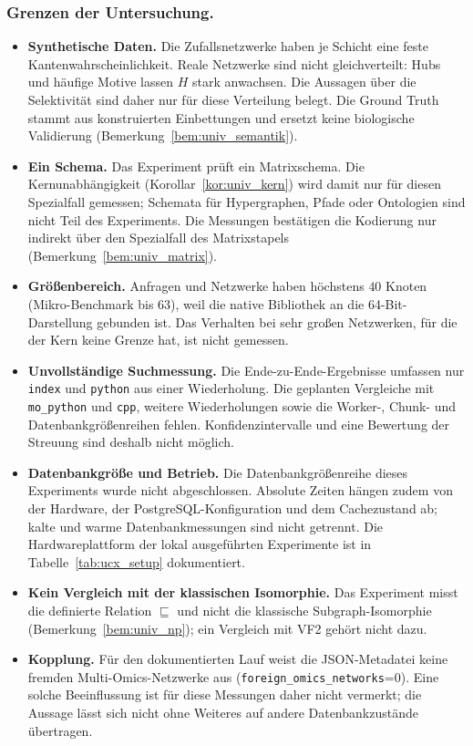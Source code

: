 \documentclass[a4paper,12pt, twoside]{report}
\theoremstyle{definition}
\begin{document}
\subsubsection{Grenzen der Untersuchung.}
\begin{itemize}
	\item \textbf{Synthetische Daten.} Die Zufallsnetzwerke haben je Schicht eine feste Kantenwahrscheinlichkeit. Reale Netzwerke sind nicht gleichverteilt: Hubs und häufige Motive lassen $H$ stark anwachsen. Die Aussagen über die Selektivität sind daher nur für diese Verteilung belegt. Die Ground Truth stammt aus konstruierten Einbettungen und ersetzt keine biologische Validierung (Bemerkung~\ref{bem:univ_semantik}).
	\item \textbf{Ein Schema.} Das Experiment prüft ein Matrixschema. Die Kernunabhängigkeit (Korollar~\ref{kor:univ_kern}) wird damit nur für diesen Spezialfall gemessen; Schemata für Hypergraphen, Pfade oder Ontologien sind nicht Teil des Experiments. Die Messungen bestätigen die Kodierung nur indirekt über den Spezialfall des Matrixstapels (Bemerkung~\ref{bem:univ_matrix}).
	\item \textbf{Größenbereich.} Anfragen und Netzwerke haben höchstens $40$ Knoten (Mikro-Benchmark bis $63$), weil die native Bibliothek an die 64-Bit-Darstellung gebunden ist. Das Verhalten bei sehr großen Netzwerken, für die der Kern keine Grenze hat, ist nicht gemessen.
	\item \textbf{Unvollständige Suchmessung.} Die Ende-zu-Ende-Ergebnisse umfassen nur \texttt{index} und \texttt{python} aus einer Wiederholung. Die geplanten Vergleiche mit \texttt{mo\_python} und \texttt{cpp}, weitere Wiederholungen sowie die Worker-, Chunk- und Datenbankgrößenreihen fehlen. Konfidenzintervalle und eine Bewertung der Streuung sind deshalb nicht möglich.
	\item \textbf{Datenbankgröße und Betrieb.} Die Datenbankgrößenreihe dieses Experiments wurde nicht abgeschlossen. Absolute Zeiten hängen zudem von der Hardware, der PostgreSQL-Konfiguration und dem Cachezustand ab; kalte und warme Datenbankmessungen sind nicht getrennt. Die Hardwareplattform der lokal ausgeführten Experimente ist in Tabelle~\ref{tab:ucx_setup} dokumentiert.
	\item \textbf{Kein Vergleich mit der klassischen Isomorphie.} Das Experiment misst die definierte Relation $\sqsubseteq$ und nicht die klassische Subgraph-Isomorphie (Bemerkung~\ref{bem:univ_np}); ein Vergleich mit VF2 gehört nicht dazu.
	\item \textbf{Kopplung.} Für den dokumentierten Lauf weist die JSON-Metadatei keine fremden Multi-Omics-Netzwerke aus (\texttt{foreign\_omics\_networks}=0). Eine solche Beeinflussung ist für diese Messungen daher nicht vermerkt; die Aussage lässt sich nicht ohne Weiteres auf andere Datenbankzustände übertragen.
\end{itemize}
\end{document}

